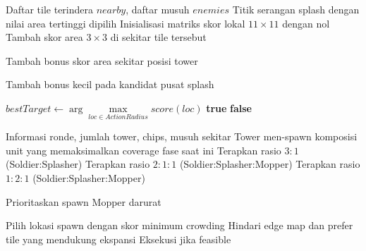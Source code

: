 \begin{breakablealgorithm}
	\caption{Greedy Splash Target Selection pada SplasherBot Alternatif 2}
	\label{alg:alt2-splasher-splash}
	\begin{algorithmic}[1]
		\Require Daftar tile terindera $nearby$, daftar musuh $enemies$
		\Ensure Titik serangan splash dengan nilai area tertinggi dipilih
		\State Inisialisasi matriks skor lokal $11 \times 11$ dengan nol
		\State Tambah skor area $3 \times 3$ di sekitar tile tersebut
		\EndFor

		\State Tambah bonus skor area sekitar posisi tower
		\EndFor

		\State Tambah bonus kecil pada kandidat pusat splash
		\EndFor

		\State $bestTarget \gets \arg\max\limits_{loc \in ActionRadius} score(loc)$
		\State {}
		\EndIf
		\State {}
		\State \Return \textbf{true}
		\EndIf
		\EndIf
		\State \Return \textbf{false}
		\EndFunction
	\end{algorithmic}
\end{breakablealgorithm}

\begin{breakablealgorithm}
	\caption{Greedy Phase-Based Spawn pada TowerBot Alternatif 2}
	\label{alg:alt2-tower-spawn}
	\begin{algorithmic}[1]
		\Require Informasi ronde, jumlah tower, chips, musuh sekitar
		\Ensure Tower men-spawn komposisi unit yang memaksimalkan coverage fase saat ini
		\State Terapkan rasio $3:1$ (Soldier:Splasher)
		\State Terapkan rasio $2:1:1$ (Soldier:Splasher:Mopper)
		\Else
		\State Terapkan rasio $1:2:1$ (Soldier:Splasher:Mopper)
		\EndIf

		\State Prioritaskan spawn Mopper darurat
		\EndIf

		\State Pilih lokasi spawn dengan skor minimum crowding
		\State Hindari edge map dan prefer tile yang mendukung ekspansi
		\State Eksekusi  jika feasible
		\EndFunction
	\end{algorithmic}
\end{breakablealgorithm}

